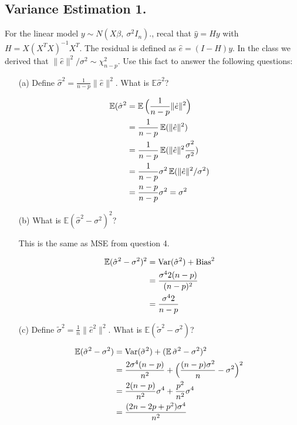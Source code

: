 \documentclass{tufte-book}
\begin{document}
\subsection{Variance Estimation 1.} For the linear model $y \sim N(X\beta, \ \sigma^2I_n)$., recal that $\hat{y}=Hy$ with $H=X(X^TX)^{-1}X^T$.  The residual is defined as $\hat{e}=(I-H)y$.  In the class we derived that $\|\hat{e}\|^2/\sigma^2 \sim \chi_{n-p}^2$.  Use this fact to answer the following questions:

\begin{enumerate}
\item[(a)] Define $\hat{\sigma}^2 = \frac{1}{n-p}\|\hat{e}\|^2$. What is $\mathbb{E}\hat{\sigma}^2$?

\begin{align*}
\operatorname{\mathbb{E}}(\hat{\sigma}^2 &= \operatorname{\mathbb{E}}\Big(\frac{1}{n-p}\|\hat{e}\|^2\Big)\\
&= \frac{1}{n-p}\operatorname{\mathbb{E}}(\|\hat{e}\|^2)\\
&= \frac{1}{n-p}\operatorname{\mathbb{E}}(\|\hat{e}\|^2\frac{\sigma^2}{\sigma^2})\\
&= \frac{1}{n-p}\sigma^2 \operatorname{\mathbb{E}}(\|\hat{e}\|^2/\sigma^2)\\
&= \frac{n-p}{n-p}\sigma^2 = \sigma^2
\end{align*}

\item[(b)] What is $\mathbb{E}(\hat{\sigma}^2-\sigma^2)^2$?

This is the same as MSE from question 4.

\begin{align*}
\mathbb{E}(\hat{\sigma}^2-\sigma^2)^2 &= \operatorname{Var}(\hat{\sigma}^2) + \text{Bias}^2\\
&= \frac{\sigma^42(n-p)}{(n-p)^2}\\
&= \frac{\sigma^4 2}{n-p}
\end{align*}

\item[(c)] Define $\tilde{\sigma}^2= \frac{1}{n}\|\hat{e}^2\|^2$.  What is $\mathbb{E}(\tilde{\sigma}^2 - \sigma^2)$?

\begin{align*}
\mathbb{E}(\tilde{\sigma}^2 - \sigma^2) &= \operatorname{Var}(\tilde{\sigma}^2) + (\operatorname{\mathbb{E}}\tilde{\sigma}^2 - \sigma^2)^2 \\
&= \frac{2 \sigma^4 (n-p)}{n^2} + \Big(\frac{(n-p)\sigma^2}{n} - \sigma^2 \Big)^2\\
&= \frac{2(n-p)}{n^2}\sigma^4 + \frac{p^2}{n^2}\sigma^4\\
&= \frac{(2n-2p+p^2)\sigma^4}{n^2}
\end{align*}


\end{enumerate}
\end{document}
